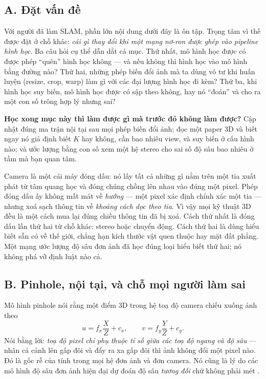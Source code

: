 \documentclass[../../../deep_learning.tex]{subfiles}
\begin{document}
\subsection{A. Đặt vấn đề}
Với người đã làm SLAM, phần lớn nội dung dưới đây là ôn tập. Trọng tâm vì thế được đặt ở chỗ khác: \emph{cái gì thay đổi khi một mạng nơ-ron được ghép vào pipeline hình học}. Ba câu hỏi cụ thể dẫn dắt cả mục. Thứ nhất, mô hình học được có được phép ``quên'' hình học không --- và nếu không thì hình học vào mô hình bằng đường nào? Thứ hai, những phép biến đổi ảnh mà ta dùng vô tư khi huấn luyện (resize, crop, warp) làm gì với các đại lượng hình học đi kèm? Thứ ba, khi hình học suy biến, mô hình học được có sập theo không, hay nó ``đoán'' và cho ra một con số trông hợp lý nhưng sai?

\textbf{Học xong mục này thì làm được gì mà trước đó không làm được?} Cập nhật đúng ma trận nội tại sau mọi phép biến đổi ảnh; đọc một paper 3D và biết ngay nó giả định biết \(K\) hay không, cần bao nhiêu view, và suy biến ở cấu hình nào; và ước lượng bằng con số xem một hệ stereo cho sai số độ sâu bao nhiêu ở tầm mà bạn quan tâm.

\begin{trucgiac}
Camera là một cái máy đóng dấu: nó lấy tất cả những gì nằm trên một tia xuất phát từ tâm quang học và đóng chúng chồng lên nhau vào đúng một pixel. Phép đóng dấu ấy không mất mát về \emph{hướng} --- một pixel xác định chính xác một tia --- nhưng xoá sạch thông tin về \emph{khoảng cách dọc theo tia}. Vì vậy mọi kỹ thuật 3D đều là một cách mua lại đúng chiều thông tin đã bị xoá. Cách thứ nhất là đóng dấu lần thứ hai từ chỗ khác: stereo hoặc chuyển động. Cách thứ hai là dùng hiểu biết sẵn có về thế giới, chẳng hạn kích thước vật quen thuộc hay mặt đất phẳng. Một mạng ước lượng độ sâu đơn ảnh đã học đúng loại hiểu biết thứ hai; nó không phá vỡ định luật nào cả.
\end{trucgiac}

\subsection{B. Pinhole, nội tại, và chỗ mọi người làm sai}
Mô hình pinhole nói rằng một điểm 3D trong hệ toạ độ camera chiếu xuống ảnh theo
\[
u = f_x\frac{X}{Z} + c_x, \qquad v = f_y\frac{Y}{Z} + c_y .
\]
Nói bằng lời: \emph{toạ độ pixel chỉ phụ thuộc \emph{tỉ số} giữa các toạ độ ngang và độ sâu} --- nhân cả cảnh lên gấp đôi và đẩy ra xa gấp đôi thì ảnh không đổi một pixel nào. Đó là gốc rễ của tính  trong mọi hệ đơn ảnh và đơn camera. Nó cũng là lý do các mô hình độ sâu đơn ảnh hiện đại dự đoán độ sâu \emph{tương đối} chứ không phải mét \cite{ranftl2022midas}.
\end{document}
